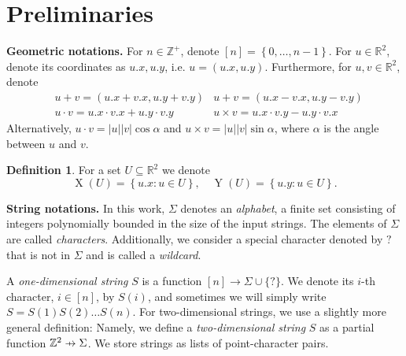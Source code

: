 \documentclass[11pt, letterpaper]{article}
\theoremstyle{plain}
\theoremstyle{definition}
\newtheorem{definition}{Definition}
\theoremstyle{remark}
\newcommand{\R}{\mathbb{R}}
\newcommand{\Z}{\mathbb{Z}}
\renewcommand{\phi}{\varphi}
\newcommand{\set}[1]{\left\lbrace #1 \right\rbrace}
\DeclareMathOperator*{\X}{X}
\DeclareMathOperator*{\Y}{Y}
\DeclareMathOperator*{\dom}{dom}
\DeclareMathOperator*{\chrome}{C}
\begin{document}
\section{Preliminaries}
\label{sec:preliminaries}
\newcommand{\x}[1]{#1.x}
\newcommand{\y}[1]{#1.y}
\newcommand{\h}[1]{\phi \times #1}
\newcommand{\s}[1]{\psi \times #1}

\textbf{Geometric notations.} For $n \in \Z^+$, denote $[n] = \set{0, \dots, n - 1}$. For $u \in \R^2$, denote its coordinates as $\x{u}, \y{u}$, i.e. $u = (\x{u}, \y{u})$. Furthermore, for $u, v \in \R^2$, denote 
\begin{align*}
&u + v = (\x{u}+\x{v}, \y{u} + \y{v})  & u + v = (\x{u}-\x{v}, \y{u}-\y{v})\\
&u \cdot v = \x{u} \cdot \x{v} + \y{u} \cdot \y{v}  & u \times v = \x{u} \cdot \y{v} - \y{u} \cdot \x{v}
\end{align*}
Alternatively, $u \cdot v = |u||v| \cos \alpha$ and $u \times v = |u||v| \sin \alpha$, where $\alpha$ is the angle between $u$ and $v$.

\begin{definition}
	For a set $U \subseteq \R^2$ we denote
	\[ \X(U) = \set{\x{u} : u \in U}, \quad \Y(U) = \set{\y{u} : u \in U}.\]
\end{definition}


\newcommand{\wild}{\texttt{?}}
\noindent \textbf{String notations.} In this work, $\Sigma$ denotes an \emph{alphabet}, a finite set consisting of integers polynomially bounded in the size of the input strings. The elements of $\Sigma$ are called \emph{characters}. Additionally, we consider a special character denoted by $\wild$ that is not in $\Sigma$ and is called a \emph{wildcard}.

\newcommand{\getchar}[1]{\chrome(#1)}
\newcommand{\pto}{\mathrel{\ooalign{\hfil$\mapstochar\mkern5mu$\hfil\cr$\to$\cr}}}
\renewcommand{\d}[1]{\dom(#1)}
\newcommand{\f}[1]{#1^\mathbf{f}}

A \emph{one-dimensional string} $S$ is a function $[n] \rightarrow \Sigma \cup \{\wild\}$. We denote its $i$-th character, $i \in [n]$, by $S(i)$, and sometimes we will simply write $S = S(1) S(2) \ldots S(n)$. For two-dimensional strings, we use a slightly more general definition: Namely, we define a \emph{two-dimensional string} $S$ as a partial function $\Z^2 \pto \Sigma$. We store strings as lists of point-character pairs. 
\end{document}
